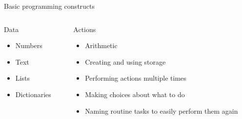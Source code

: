 \documentclass{beamer}
\begin{document}
\begin{frame}{Basic programming constructs}
  \begin{columns}[T]
    \begin{column}{0.4\columnwidth}
      \begin{block}{Data}
        \begin{itemize}
          \item<1,2,3> Numbers
          \item<1,2,4> Text
          \item<1,2,5> Lists
          \item<1,2,6> Dictionaries
        \end{itemize}
      \end{block}
    \end{column}
    \begin{column}{0.4\columnwidth}
      \begin{block}{Actions}
        \begin{itemize}
          \item<1,7,8> Arithmetic
          \item<1,7,9> Creating and using storage
          \item<1,7,10> Performing actions multiple times
          \item<1,7,11> Making choices about what to do
          \item<1,7,12> Naming routine tasks to easily perform them again
        \end{itemize}
      \end{block}
    \end{column}
  \end{columns}
\end{frame}
\end{document}
